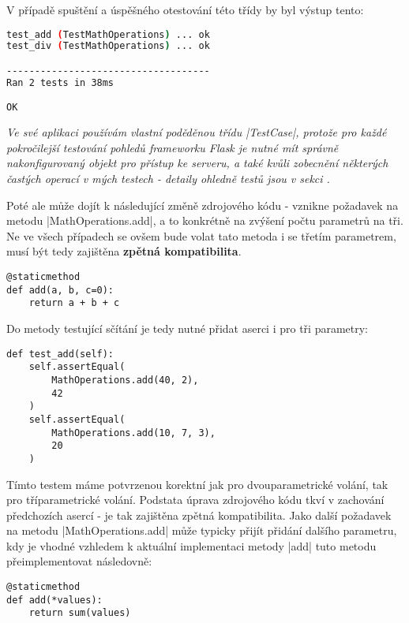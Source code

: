 V případě spuštění a úspěšného otestování této třídy by byl výstup tento:
\begin{lstlisting}[language=bash, caption={Ukázka výstupu ze spuštění testů}]
test_add (TestMathOperations) ... ok
test_div (TestMathOperations) ... ok

------------------------------------
Ran 2 tests in 38ms

OK
\end{lstlisting}


{\itshape
	Ve své aplikaci používám vlastní poděděnou třídu \ic|TestCase|, protože pro každé pokročilejší testování pohledů frameworku Flask je nutné mít správně nakonfigurovaný objekt pro  přístup ke serveru, a také kvůli zobecnění některých častých operací v mých testech - detaily ohledně testů jsou v sekci .
}


Poté ale může dojít k následující změně zdrojového k\'{o}du - vznikne požadavek na metodu \ic|MathOperations.add|, a to konkrétně na zvýšení počtu parametrů na tři. Ne ve všech případech se ovšem bude volat tato metoda i se třetím parametrem, musí být tedy zajištěna \textbf{zpětná kompatibilita}.

\begin{lstlisting}[caption={Vylepšená implementace metoda $MathOperations.add$}]
@staticmethod
def add(a, b, c=0):
	return a + b + c
\end{lstlisting}

Do metody testující sčítání je tedy nutné přidat aserci i pro tři parametry:

\begin{lstlisting}[caption={Testovací metoda pro upravenou implementaci $MathOperations.add$}]
def test_add(self):
	self.assertEqual(
		MathOperations.add(40, 2),
		42
	)
	self.assertEqual(
		MathOperations.add(10, 7, 3),
		20
	)
\end{lstlisting}

\begin{sloppypar}
	Tímto testem máme potvrzenou korektní jak pro dvouparametrické volání, tak pro  tříparametrické volání. Podstata úprava zdrojového kódu tkví v zachování předchozích asercí - je tak zajištěna zpětná kompatibilita. Jako další požadavek na metodu \ic|MathOperations.add| může typicky přijít přidání dalšího parametru, kdy je vhodné vzhledem k aktuální implementaci metody \ic|add| tuto metodu přeimplementovat následovně:
\end{sloppypar}

\begin{lstlisting}[caption={Finální implementace metody $MathOperations.add$}]
@staticmethod
def add(*values):
	return sum(values)
\end{lstlisting}


